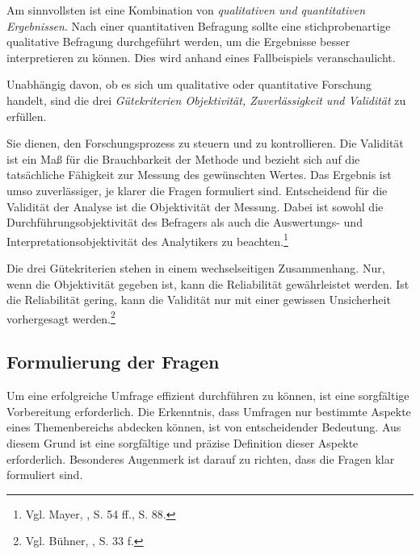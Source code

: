 Am sinnvollsten ist eine Kombination von \textit{qualitativen und quantitativen Ergebnissen}. Nach einer quantitativen
Befragung sollte eine stichprobenartige qualitative Befragung durchgeführt werden, um die Ergebnisse besser
interpretieren zu können. Dies wird anhand eines Fallbeispiels veranschaulicht.

Unabhängig davon, ob es sich um qualitative oder quantitative Forschung handelt, sind die drei \textit{Gütekriterien
Objektivität, Zuverlässigkeit und Validität} zu erfüllen.

Sie dienen, den Forschungsprozess zu steuern und zu kontrollieren. Die Validität ist ein Maß für die Brauchbarkeit der
Methode und bezieht sich auf die tatsächliche Fähigkeit zur Messung des gewünschten Wertes. Das Ergebnis ist umso
zuverlässiger, je klarer die Fragen formuliert sind. Entscheidend für die Validität der Analyse ist die Objektivität
der Messung. Dabei ist sowohl die Durchführungsobjektivität des Befragers als auch die Auswertungs- und
Interpretationsobjektivität des Analytikers zu beachten.\footnote{Vgl. Mayer, \cite{Interview und schriftliche Befragung}, S. 54 ff., S. 88.}

Die drei Gütekriterien stehen in einem wechselseitigen Zusammenhang. Nur, wenn die Objektivität gegeben ist, kann die
Reliabilität gewährleistet werden. Ist die Reliabilität gering, kann die Validität nur mit einer gewissen Unsicherheit
vorhergesagt werden.\footnote{Vgl. Bühner, \cite{Einfuehrung in die Test- und Fragebogenkonstruktion}, S. 33 f.}

\subsection{Formulierung der Fragen}
Um eine erfolgreiche Umfrage effizient durchführen zu können, ist eine sorgfältige Vorbereitung erforderlich. Die
Erkenntnis, dass Umfragen nur bestimmte Aspekte eines Themenbereichs abdecken können, ist von entscheidender Bedeutung.
Aus diesem Grund ist eine sorgfältige und präzise Definition dieser Aspekte erforderlich. Besonderes Augenmerk ist darauf
zu richten, dass die Fragen klar formuliert sind.

